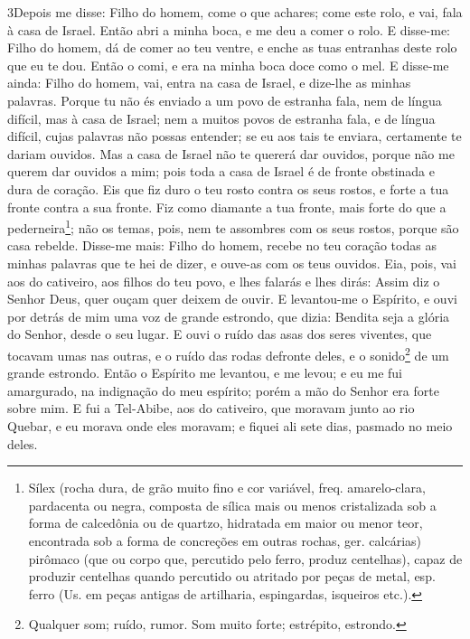 \lettrine{3} Depois me disse: Filho do homem, come o que
achares; come este rolo, e vai, fala à casa de Israel. Então
abri a minha boca, e me deu a comer o rolo. E disse-me: Filho do
homem, dá de comer ao teu ventre, e enche as tuas entranhas deste
rolo que eu te dou. Então o comi, e era na minha boca doce como o
mel. E disse-me ainda: Filho do homem, vai, entra na casa de
Israel, e dize-lhe as minhas palavras. Porque tu não és enviado
a um povo de estranha fala, nem de língua difícil, mas à casa de
Israel; nem a muitos povos de estranha fala, e de língua
difícil, cujas palavras não possas entender; se eu aos tais te
enviara, certamente te dariam ouvidos. Mas a casa de Israel não
te quererá dar ouvidos, porque não me querem dar ouvidos a mim; pois
toda a casa de Israel é de fronte obstinada e dura de coração.
Eis que fiz duro o teu rosto contra os seus rostos, e forte a
tua fronte contra a sua fronte. Fiz como diamante a tua fronte,
mais forte do que a pederneira\footnote{Sílex (rocha dura, de grão
muito fino e cor variável, freq. amarelo-clara, pardacenta ou negra,
composta de sílica mais ou menos cristalizada sob a forma de
calcedônia ou de quartzo, hidratada em maior ou menor teor,
encontrada sob a forma de concreções em outras rochas, ger.
calcárias) pirômaco (que ou corpo que, percutido pelo ferro, produz
centelhas), capaz de produzir centelhas quando percutido ou atritado
por peças de metal, esp. ferro (Us. em peças antigas de artilharia,
espingardas, isqueiros etc.).}; não os temas, pois, nem te assombres
com os seus rostos, porque são casa rebelde. Disse-me mais:
Filho do homem, recebe no teu coração todas as minhas palavras que
te hei de dizer, e ouve-as com os teus ouvidos. Eia, pois,
vai aos do cativeiro, aos filhos do teu povo, e lhes falarás e lhes
dirás: Assim diz o Senhor Deus, quer ouçam quer deixem de ouvir.
E levantou-me o Espírito, e ouvi por detrás de mim uma voz de
grande estrondo, que dizia: Bendita seja a glória do Senhor, desde o
seu lugar. E ouvi o ruído das asas dos seres viventes, que
tocavam umas nas outras, e o ruído das rodas defronte deles, e o
sonido\footnote{Qualquer som; ruído, rumor. Som muito forte;
estrépito, estrondo.} de um grande estrondo. Então o Espírito
me levantou, e me levou; e eu me fui amargurado, na indignação do
meu espírito; porém a mão do Senhor era forte sobre mim. E
fui a Tel-Abibe, aos do cativeiro, que moravam junto ao rio Quebar,
e eu morava onde eles moravam; e fiquei ali sete dias, pasmado no
meio deles.

